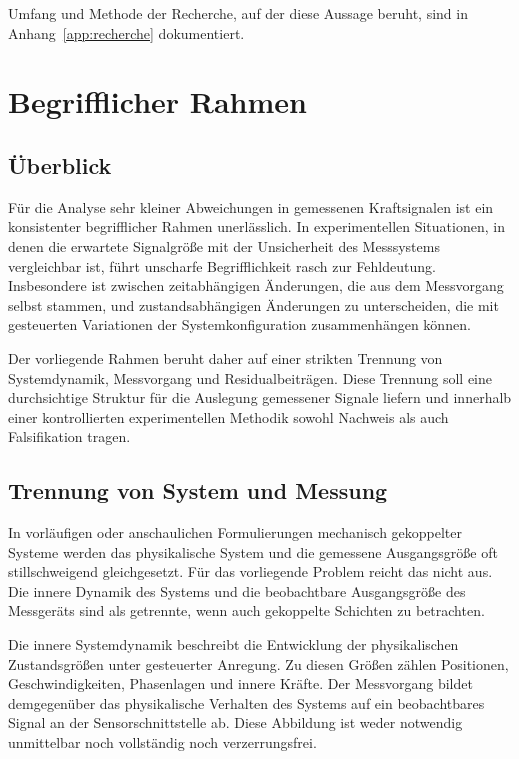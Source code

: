 \documentclass[12pt,a4paper]{report}
\begin{document}
Umfang und Methode der Recherche, auf der diese Aussage beruht, sind in
Anhang~\ref{app:recherche} dokumentiert.



\chapter{Begrifflicher Rahmen}
\label{chap:rahmen}

\section{Überblick}

Für die Analyse sehr kleiner Abweichungen in gemessenen Kraftsignalen ist
ein konsistenter begrifflicher Rahmen unerlässlich. In experimentellen
Situationen, in denen die erwartete Signalgröße mit der Unsicherheit des
Messsystems vergleichbar ist, führt unscharfe Begrifflichkeit rasch zur
Fehldeutung. Insbesondere ist zwischen zeitabhängigen Änderungen, die aus
dem Messvorgang selbst stammen, und zustandsabhängigen Änderungen zu
unterscheiden, die mit gesteuerten Variationen der Systemkonfiguration
zusammenhängen können.

Der vorliegende Rahmen beruht daher auf einer strikten Trennung von
Systemdynamik, Messvorgang und Residualbeiträgen. Diese Trennung soll
eine durchsichtige Struktur für die Auslegung gemessener Signale liefern
und innerhalb einer kontrollierten experimentellen Methodik sowohl
Nachweis als auch Falsifikation tragen.

\section{Trennung von System und Messung}

In vorläufigen oder anschaulichen Formulierungen mechanisch gekoppelter
Systeme werden das physikalische System und die gemessene Ausgangsgröße
oft stillschweigend gleichgesetzt. Für das vorliegende Problem reicht das
nicht aus. Die innere Dynamik des Systems und die beobachtbare
Ausgangsgröße des Messgeräts sind als getrennte, wenn auch gekoppelte
Schichten zu betrachten.

Die innere Systemdynamik beschreibt die Entwicklung der physikalischen
Zustandsgrößen unter gesteuerter Anregung. Zu diesen Größen zählen
Positionen, Geschwindigkeiten, Phasenlagen und innere Kräfte. Der
Messvorgang bildet demgegenüber das physikalische Verhalten des Systems
auf ein beobachtbares Signal an der Sensorschnittstelle ab. Diese
Abbildung ist weder notwendig unmittelbar noch vollständig noch
verzerrungsfrei.
\end{document}
